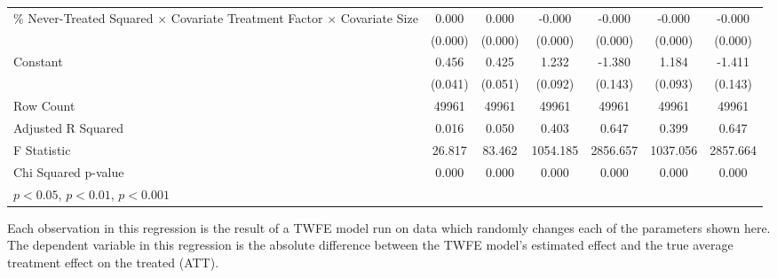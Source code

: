 \begin{table}[htbp]
{\begin{tabular}{p{4.5in}|*{6}{c}}
\% Never-Treated Squared $\times$ Covariate Treatment Factor $\times$ Covariate Size&       0.000\sym{***}&       0.000\sym{**} &      -0.000         &      -0.000\sym{*}  &      -0.000         &      -0.000\sym{**} \\
                    &     (0.000)         &     (0.000)         &     (0.000)         &     (0.000)         &     (0.000)         &     (0.000)         \\
Constant            &       0.456\sym{***}&       0.425\sym{***}&       1.232\sym{***}&      -1.380\sym{***}&       1.184\sym{***}&      -1.411\sym{***}\\
                    &     (0.041)         &     (0.051)         &     (0.092)         &     (0.143)         &     (0.093)         &     (0.143)         \\
\hline
Row Count           &   49961         &   49961         &   49961         &   49961         &   49961         &   49961         \\
Adjusted R Squared  &       0.016         &       0.050         &       0.403         &       0.647         &       0.399         &       0.647         \\
F Statistic         &      26.817         &      83.462         &    1054.185         &    2856.657         &    1037.056         &    2857.664         \\
Chi Squared p-value &       0.000         &       0.000         &       0.000         &       0.000         &       0.000         &       0.000         \\
\hline\hline
\multicolumn{7}{l}{\footnotesize \sym{*} \(p<0.05\), \sym{**} \(p<0.01\), \sym{***} \(p<0.001\)}\\
\end{tabular}
}
\footnotesize  
\vspace{5mm}
    \footnotesize \begin{singlespace*}
        Each observation in this regression is the result of a TWFE model run on data which randomly changes each of the parameters shown here. The dependent variable in this regression is the absolute difference between the TWFE model's estimated effect and the true average treatment effect on the treated (ATT).
    \end{singlespace*}
\end{table}